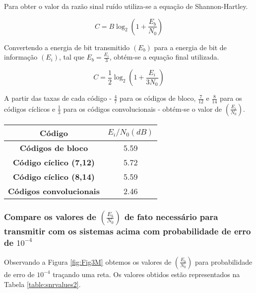 Para obter o valor da razão sinal ruído utiliza-se a equação de Shannon-Hartley.

\begin{equation}
C=B\log_{2}(1+\frac{E_{b}}{N_{0}})
\end{equation}

Convertendo a energia de bit transmitido $(E_{b})$ para a energia de bit de informação $(E_{i})$, tal que $E_{b} = \frac{E_{i}}{3}$, obtém-se a equação final utilizada.

\begin{equation}
C=\frac{1}{2}\log_{2}(1+\frac{E_{i}}{3N_{0}})
\end{equation}

A partir das taxas de cada código - $\frac{4}{7}$ para os códigos de bloco, $\frac{7}{12}$ e $\frac{8}{14}$ para os códigos cíclicos e $\frac{1}{3}$ para os códigos convolucionais - obtém-se o valor de $(\frac{E_{i}}{N_{0}})$.

\begin{table}[H]
	\centering
	\captionsetup{font=scriptsize}
	\begin{tabular}{c|c}
		\textbf{Código} & \textbf{$E_{i}/N_{0} (dB)$} \\ \hline
		\textbf{Códigos de bloco} & 5.59 \\
		\textbf{Código cíclico (7,12)} & 5.72 \\
		\textbf{Código cíclico (8,14)} & 5.59 \\
		\textbf{Códigos convolucionais} & 2.46
	\end{tabular}
\end{table}

\subsubsection{Compare os valores de $(\frac{E_{b}}{N_{0}})$ de fato necessário para transmitir com os sistemas acima com probabilidade de erro de $10^{-4}$}

Observando a Figura \ref{fig:Fig3M} obtemos os valores de $(\frac{E_{b}}{N_{0}})$ para probabilidade de erro de $10^{-4}$ traçando uma reta. Os valores obtidos estão representados na Tabela \ref{table:snrvalues2}.

